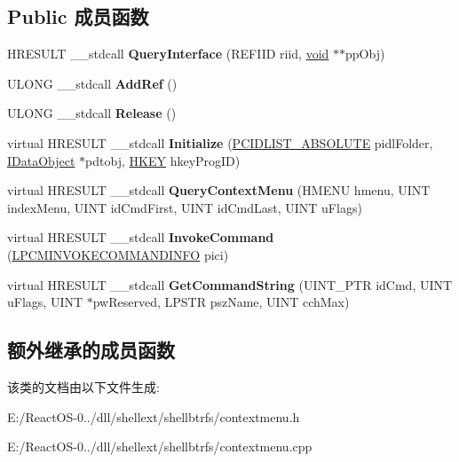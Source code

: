 \subsection*{Public 成员函数}
\begin{DoxyCompactItemize}
\item 
\mbox{\label{class_btrfs_context_menu_a2c0a231318e33217aadc3f15967efd85}} 
H\+R\+E\+S\+U\+LT \+\_\+\+\_\+stdcall {\bfseries Query\+Interface} (R\+E\+F\+I\+ID riid, \hyperlink{interfacevoid}{void} $\ast$$\ast$pp\+Obj)
\item 
\mbox{\label{class_btrfs_context_menu_ac6679de8b0614bb91255a441f7fed856}} 
U\+L\+O\+NG \+\_\+\+\_\+stdcall {\bfseries Add\+Ref} ()
\item 
\mbox{\label{class_btrfs_context_menu_a282ef8e5b09ac5d5a8e2cec1d442d705}} 
U\+L\+O\+NG \+\_\+\+\_\+stdcall {\bfseries Release} ()
\item 
\mbox{\label{class_btrfs_context_menu_aa711d092aac5c3e5e612b00481096ce3}} 
virtual H\+R\+E\+S\+U\+LT \+\_\+\+\_\+stdcall {\bfseries Initialize} (\hyperlink{struct___i_t_e_m_i_d_l_i_s_t___a_b_s_o_l_u_t_e}{P\+C\+I\+D\+L\+I\+S\+T\+\_\+\+A\+B\+S\+O\+L\+U\+TE} pidl\+Folder, \hyperlink{interface_i_data_object}{I\+Data\+Object} $\ast$pdtobj, \hyperlink{interfacevoid}{H\+K\+EY} hkey\+Prog\+ID)
\item 
\mbox{\label{class_btrfs_context_menu_a8ac0a6b11701b68c5253a9fe87dc1056}} 
virtual H\+R\+E\+S\+U\+LT \+\_\+\+\_\+stdcall {\bfseries Query\+Context\+Menu} (H\+M\+E\+NU hmenu, U\+I\+NT index\+Menu, U\+I\+NT id\+Cmd\+First, U\+I\+NT id\+Cmd\+Last, U\+I\+NT u\+Flags)
\item 
\mbox{\label{class_btrfs_context_menu_a8ce3271696ee07d22e408c25119059db}} 
virtual H\+R\+E\+S\+U\+LT \+\_\+\+\_\+stdcall {\bfseries Invoke\+Command} (\hyperlink{struct_i_context_menu_1_1tag_c_m_i_n_v_o_k_e_c_o_m_m_a_n_d_i_n_f_o}{L\+P\+C\+M\+I\+N\+V\+O\+K\+E\+C\+O\+M\+M\+A\+N\+D\+I\+N\+FO} pici)
\item 
\mbox{\label{class_btrfs_context_menu_a3895a89777766a4fb857eaf647de890c}} 
virtual H\+R\+E\+S\+U\+LT \+\_\+\+\_\+stdcall {\bfseries Get\+Command\+String} (U\+I\+N\+T\+\_\+\+P\+TR id\+Cmd, U\+I\+NT u\+Flags, U\+I\+NT $\ast$pw\+Reserved, L\+P\+S\+TR psz\+Name, U\+I\+NT cch\+Max)
\end{DoxyCompactItemize}
\subsection*{额外继承的成员函数}


该类的文档由以下文件生成\+:\begin{DoxyCompactItemize}
\item 
E\+:/\+React\+O\+S-\/0../dll/shellext/shellbtrfs/contextmenu.\+h\item 
E\+:/\+React\+O\+S-\/0../dll/shellext/shellbtrfs/contextmenu.\+cpp\end{DoxyCompactItemize}
